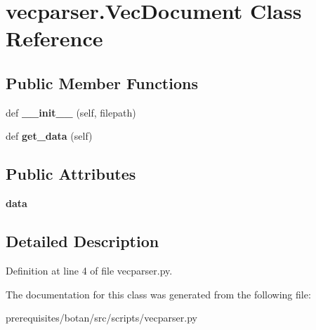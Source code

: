 \hypertarget{classvecparser_1_1_vec_document}{}\section{vecparser.\+Vec\+Document Class Reference}
\label{classvecparser_1_1_vec_document}
\subsection*{Public Member Functions}
\begin{DoxyCompactItemize}
\item 
\mbox{\label{classvecparser_1_1_vec_document_ae5e83ee8e959ac8cbe962b9a7a61e606}} 
def {\bfseries \+\_\+\+\_\+init\+\_\+\+\_\+} (self, filepath)
\item 
\mbox{\label{classvecparser_1_1_vec_document_a98f0d6f543fbe822fb396e72918538d6}} 
def {\bfseries get\+\_\+data} (self)
\end{DoxyCompactItemize}
\subsection*{Public Attributes}
\begin{DoxyCompactItemize}
\item 
\mbox{\label{classvecparser_1_1_vec_document_a9c746929b9717e7a2fc64eb82a1fa2eb}} 
{\bfseries data}
\end{DoxyCompactItemize}


\subsection{Detailed Description}


Definition at line 4 of file vecparser.\+py.



The documentation for this class was generated from the following file\+:\begin{DoxyCompactItemize}
\item 
prerequisites/botan/src/scripts/vecparser.\+py\end{DoxyCompactItemize}
